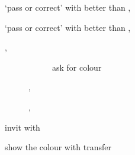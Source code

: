 \documentclass[../main.tex]{subfiles}
\begin{document}

\begin{description}
    \item[] `pass or correct' with better \SpadeSym{} than \HeartSym, 
        \begin{description}
            \item[\PassBid] 
            \item[] 
        \end{description}
    \item[] `pass or correct' with better \HeartSym{} than \SpadeSym, 
        \begin{description}
            \item[\PassBid] 
            \item[] 
        \end{description}
    \item[] \Relay, 
        \begin{description}
            \item[] 
                \begin{description}
                    \item[] ask for colour
                        \begin{description}
                            \item[] 
                            \item[] 
                        \end{description}
                \end{description}
            \item[] , 
            \item[] , 
        \end{description}
    \item[]
    \item[] invit with 
    \item[] show the colour with transfer

\end{description}
\end{document}
